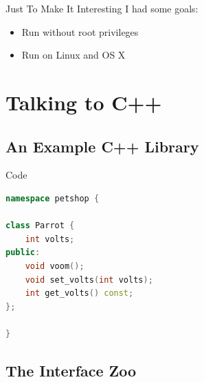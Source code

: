 \documentclass{beamer}
\begin{document}
\begin{frame}{Just To Make It Interesting}
  I had some goals:
  \begin{itemize}
    \item Run without root privileges
    \item Run on Linux and OS X
  \end{itemize}
\end{frame}

\section{Talking to C++}

\subsection{An Example C++ Library}

\begin{frame}[fragile=singleslide]{Code}
\begin{lstlisting}[language=c++]
namespace petshop {

class Parrot {
    int volts;
public:
    void voom();
    void set_volts(int volts);
    int get_volts() const;
};

}
\end{lstlisting}
\end{frame}

\subsection{The Interface Zoo}
\end{document}
